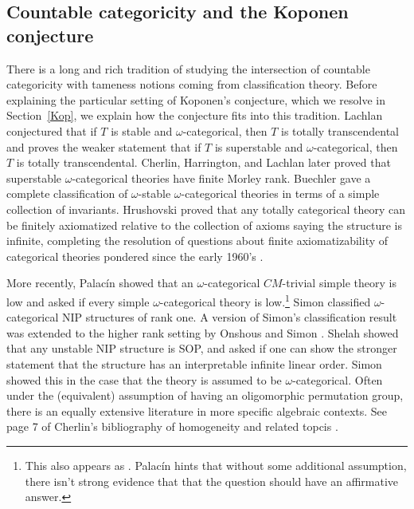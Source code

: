 \documentclass[11pt]{amsart}
\theoremstyle{definition}
\theoremstyle{remark}
\numberwithin{equation}{section}
\begin{document}
\subsection{Countable categoricity and the Koponen conjecture} 
There is a long and rich tradition of studying the intersection of countable categoricity with tameness notions coming from classification theory. Before explaining the particular setting of Koponen's conjecture, which we resolve in Section~\ref{Kop}, we explain how the conjecture fits into this tradition. Lachlan \cite{lachlan1974two} conjectured that if $T$ is stable and $\omega$-categorical, then $T$ is totally transcendental and proves the weaker statement that if $T$ is superstable and $\omega$-categorical, then $T$ is totally transcendental. 
Cherlin, Harrington, and Lachlan \cite{cherlin1985aleph} later proved that superstable $\omega$-categorical theories have finite Morley rank. Buechler \cite{buechler1985invariants} gave a complete classification of $\omega$-stable $\omega$-categorical theories in terms of a simple collection of invariants. Hrushovski \cite{hrushovski1989totally} proved that any totally categorical theory can be finitely axiomatized relative to the collection of axioms saying the structure is infinite,  completing the resolution of questions about finite axiomatizability of categorical theories  pondered since the early 1960's \cite{M65}.


More recently, Palac\'in \cite{palacin2012omega} showed that an $\omega$-categorical $CM$-trivial simple theory is low and asked \cite[see the Question on Page 10]{palacin2012omega} 
if every simple $\omega$-categorical theory is low.\footnote{This also appears as \cite[Question 2, page 755]{casanovas2002local}. Palac\'in hints that without some additional assumption, there isn't strong evidence that that the question should have an affirmative answer.} Simon \cite{simon2022cat} classified $\omega$-categorical NIP structures of rank one. A version of Simon's classification result was extended to the higher rank setting by Onshous and Simon \cite{onshuus2021dependent}. Shelah \cite{shelah1971stability}  showed that any unstable NIP structure is SOP, and asked if one can show the stronger statement that the structure has an interpretable infinite linear order. Simon \cite{simon2022linear} showed this in the case that the theory is assumed to be $\omega$-categorical. Often under the (equivalent) assumption of having an oligomorphic permutation group, there is an equally extensive literature in more specific algebraic contexts. See page 7 of Cherlin's bibliography of homogeneity and related topcis \cite{cherlin2021homogeneity}.  
\end{document}

